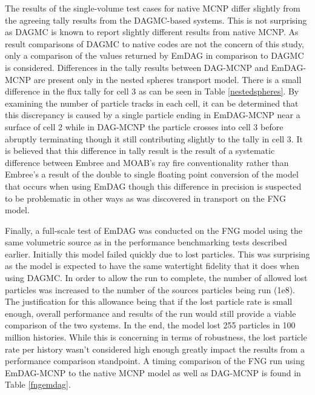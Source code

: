 The results of the single-volume test cases for native MCNP differ slightly from
the agreeing tally results from the DAGMC-based systems. This is not surprising
as DAGMC is known to report slightly different results from native MCNP. As
result comparisons of DAGMC to native codes are not the concern of this study,
only a comparison of the values returned by EmDAG in comparison to DAGMC is
considered. Differences in the tally results between DAG-MCNP and EmDAG-MCNP are
present only in the nested spheres transport model. There is a small difference
in the flux tally for cell 3 as can be seen in Table \ref{nestedspheres}. By
examining the number of particle tracks in each cell, it can be determined that
this discrepancy is caused by a single particle ending in EmDAG-MCNP near a
surface of cell 2 while in DAG-MCNP the particle crosses into cell 3 before
abruptly terminating though it still contributing slightly to the tally in cell
3. It is believed that this difference in tally result is the result of a
systematic difference between Embree and MOAB's ray fire conventionality rather
than Embree's a result of the double to single floating point conversion of the
model that occurs when using EmDAG though this difference in precision is
suspected to be problematic in other ways as was discovered in transport on the
FNG model.

Finally, a full-scale test of EmDAG was conducted on the FNG model using the
same volumetric source as in the performance benchmarking tests described
earlier. Initially this model failed quickly due to lost particles. This was
surprising as the model is expected to have the same watertight fidelity that it
does when using DAGMC. In order to allow the run to complete, the number of
allowed lost particles was increased to the number of the sources particles
being run (1e8). The justification for this allowance being that if the lost
particle rate is small enough, overall performance and results of the run would
still provide a viable comparison of the two systems. In the end, the model lost
255 particles in 100 million histories. While this is concerning in terms of
robustness, the lost particle rate per history wasn't considered high enough
greatly impact the results from a performance comparison standpoint. A timing
comparison of the FNG run using EmDAG-MCNP to the native MCNP model as well as
DAG-MCNP is found in Table \ref{fngemdag}.

